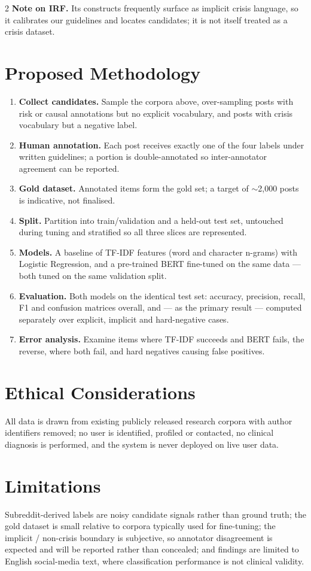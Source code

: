 \documentclass[11pt]{article}
\begin{document}
\begin{multicols}{2}
\vspace{3pt}
\textbf{Note on IRF.} Its constructs frequently surface as implicit crisis language, so it calibrates our guidelines and locates candidates; it is not itself treated as a crisis dataset.

\section{Proposed Methodology}
\begin{enumerate}[leftmargin=1.3em, itemsep=1pt, topsep=1.5pt, parsep=0pt]
\item \textbf{Collect candidates.} Sample the corpora above, over-sampling posts with risk or causal annotations but no explicit vocabulary, and posts with crisis vocabulary but a negative label.
\item \textbf{Human annotation.} Each post receives exactly one of the four labels under written guidelines; a portion is double-annotated so inter-annotator agreement can be reported.
\item \textbf{Gold dataset.} Annotated items form the gold set; a target of $\sim$2,000 posts is indicative, not finalised.
\item \textbf{Split.} Partition into train/validation and a held-out test set, untouched during tuning and stratified so all three slices are represented.
\item \textbf{Models.} A baseline of TF-IDF features (word and character n-grams) with Logistic Regression, and a pre-trained BERT fine-tuned on the same data --- both tuned on the same validation split.
\item \textbf{Evaluation.} Both models on the identical test set: accuracy, precision, recall, F1 and confusion matrices overall, and --- as the primary result --- computed separately over explicit, implicit and hard-negative cases.
\item \textbf{Error analysis.} Examine items where TF-IDF succeeds and BERT fails, the reverse, where both fail, and hard negatives causing false positives.
\end{enumerate}

\section{Ethical Considerations}
All data is drawn from existing publicly released research corpora with author identifiers removed; no user is identified, profiled or contacted, no clinical diagnosis is performed, and the system is never deployed on live user data.

\section{Limitations}
Subreddit-derived labels are noisy candidate signals rather than ground truth; the gold dataset is small relative to corpora typically used for fine-tuning; the implicit / non-crisis boundary is subjective, so annotator disagreement is expected and will be reported rather than concealed; and findings are limited to English social-media text, where classification performance is not clinical validity.

\end{multicols}
\end{document}
